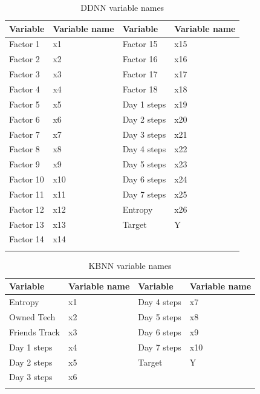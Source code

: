 \documentclass[preprint,12pt]{elsarticle}
\begin{document}
\newpage
\begin{table}[H]
\centering
\caption{DDNN variable names}
\begin{tabular}{llll}
\hline
Variable  & Variable name & Variable    & Variable name \\
\hline
Factor 1  & x1           & Factor 15   & x15            \\
Factor 2  & x2           & Factor 16   & x16            \\
Factor 3  & x3           & Factor 17   & x17           \\
Factor 4  & x4           & Factor 18   & x18           \\
Factor 5  & x5           & Day 1 steps & x19           \\
Factor 6  & x6           & Day 2 steps & x20           \\
Factor 7  & x7           & Day 3 steps & x21           \\
Factor 8  & x8           & Day 4 steps & x22           \\
Factor 9  & x9           & Day 5 steps & x23           \\
Factor 10 & x10          & Day 6 steps & x24           \\
Factor 11 & x11          & Day 7 steps & x25         \\
Factor 12 & x12          & Entropy & x26           \\
Factor 13 & x13          & Target &  Y   \\
Factor 14 & x14          &            \\
\hline
\label{tab:DDNN_Variable_names}
\end{tabular}
\end{table}

\begin{table}[H]
\centering
\caption{KBNN variable names}
\begin{tabular}{llll}
\hline
Variable      & Variable name & Variable    & Variable name \\
\hline
Entropy       & x1            & Day 4 steps & x7            \\
Owned Tech    & x2            & Day 5 steps & x8            \\
Friends Track & x3            & Day 6 steps & x9            \\
Day 1 steps   & x4            & Day 7 steps & x10           \\
Day 2 steps   & x5            & Target      & Y             \\
Day 3 steps   & x6            &             &           \\
\hline
\label{tab:KBNN_Variable_names}
\end{tabular}
\end{table}
\end{document}
